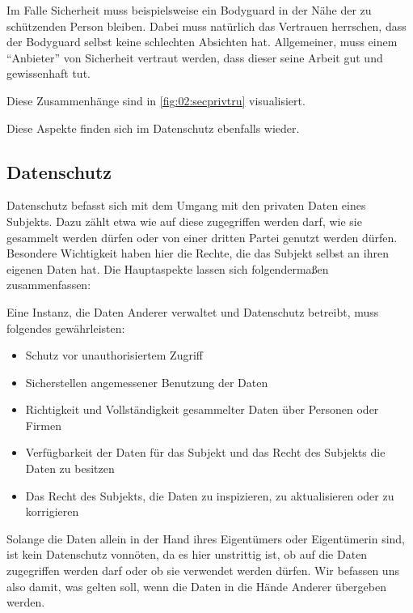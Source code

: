 Im Falle Sicherheit muss beispielsweise ein Bodyguard in der Nähe der zu schützenden Person bleiben.
Dabei muss natürlich das Vertrauen herrschen, dass der Bodyguard selbst keine schlechten Absichten hat.
Allgemeiner, muss einem \enquote{Anbieter} von Sicherheit vertraut werden, dass dieser seine Arbeit gut und gewissenhaft tut.

Diese Zusammenhänge sind in \cref{fig:02:secprivtru} visualisiert.

Diese Aspekte finden sich im Datenschutz ebenfalls wieder.

\subsection{Datenschutz}

Datenschutz befasst sich mit dem Umgang mit den privaten Daten eines Subjekts.
Dazu zählt etwa wie auf diese zugegriffen werden darf, wie sie gesammelt werden dürfen oder von einer dritten Partei genutzt werden dürfen.
Besondere Wichtigkeit haben hier die Rechte, die das Subjekt selbst an ihren eigenen Daten hat.
Die Hauptaspekte lassen sich folgendermaßen zusammenfassen:\cite{lee_ethical_2016}  

\begin{center}
\parbox{0.9\textwidth}{
    Eine Instanz, die Daten Anderer verwaltet und Datenschutz betreibt, muss folgendes gewährleisten: 
    \begin{itemize}
        \item Schutz vor unauthorisiertem Zugriff
        \item Sicherstellen angemessener Benutzung der Daten
        \item Richtigkeit und Vollständigkeit gesammelter Daten über Personen oder Firmen
        \item Verfügbarkeit der Daten für das Subjekt und das Recht des Subjekts die Daten zu besitzen
        \item Das Recht des Subjekts, die Daten zu inspizieren, zu aktualisieren oder zu korrigieren
    \end{itemize}
}
\end{center}

Solange die Daten allein in der Hand ihres Eigentümers oder Eigentümerin sind, ist kein Datenschutz vonnöten,
da es hier unstrittig ist, ob auf die Daten zugegriffen werden darf oder ob sie verwendet werden dürfen.
Wir befassen uns also damit, was gelten soll, wenn die Daten in die Hände Anderer übergeben werden.

